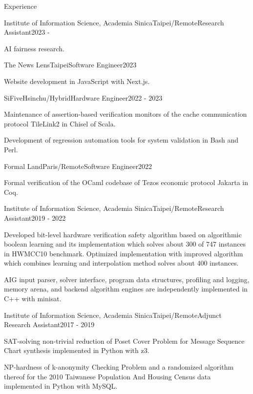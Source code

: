 \documentclass{resume} %
\begin{document}
\begin{rSection}{Experience}

\begin{rSubsection}{Institute of Information Science, Academia Sinica}{Taipei/Remote}{Research Assistant}{2023 - }
\item AI fairness research.
\end{rSubsection}

\begin{rSubsection}{The News Lens}{Taipei}{Software Engineer}{2023}
\item Website development in JavaScript with Next.js.
\end{rSubsection}

\begin{rSubsection}{SiFive}{Hsinchu/Hybrid}{Hardware Engineer}{2022 - 2023}
\item Maintenance of assertion-based verification monitors of the cache communication protocol TileLink2 in Chisel of Scala.
\item Development of regression automation tools for system validation in Bash and Perl.
\end{rSubsection}

\begin{rSubsection}{Formal Land}{Paris/Remote}{Software Engineer}{2022}
\item Formal verification of the OCaml codebase of Tezos economic protocol Jakarta in Coq.
\end{rSubsection}

\begin{rSubsection}{Institute of Information Science, Academia Sinica}{Taipei/Remote}{Research Assistant}{2019 - 2022}
\item Developed bit-level hardware verification safety algorithm based on algorithmic boolean learning and
its implementation which solves about 300 of 747 instances in HWMCC10 benchmark.
Optimized implementation with improved algorithm which combines learning and interpolation method solves about 400 instances.
\item AIG input parser, solver interface, program data structures, profiling and logging,
memory arena, and backend algorithm engines are independently implemented in C++ with minisat.
\end{rSubsection}

\begin{rSubsection}{Institute of Information Science, Academia Sinica}{Taipei/Remote}{Adjunct Research Assistant}{2017 - 2019}
\item SAT-solving non-trivial reduction of Poset Cover Problem for Message Sequence Chart synthesis implemented in Python with z3.
\item NP-hardness of k-anonymity Checking Problem and a randomized algorithm thereof for the 2010 Taiwanese Population And Housing Census data implemented in Python with MySQL.
\end{rSubsection}

\end{rSection}
\end{document}
